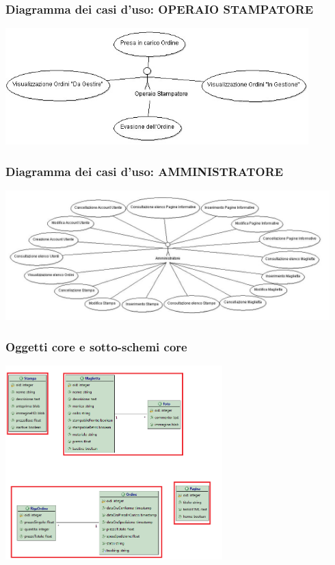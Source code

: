 \documentclass[10pt]{beamer}
\begin{document}
\begin{frame}
	\frametitle{Diagramma dei casi d'uso: OPERAIO STAMPATORE}
	\includegraphics[height=4.5cm]{Immagine/CasoOperaioStampatore.jpg}
\end{frame}

\begin{frame}
	\frametitle{Diagramma dei casi d'uso: AMMINISTRATORE}
	\includegraphics[height=5cm]{Immagine/CasoAmministratore.jpg}
\end{frame}

\begin{frame}
	\frametitle{Oggetti core e sotto-schemi core}
	\begin{center}
		\includegraphics[height=7.5cm]{Immagine/Core.png}
	\end{center}
\end{frame}
\end{document}

